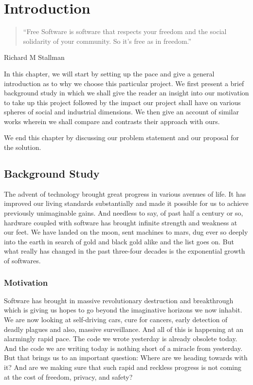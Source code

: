 \chapter{Introduction}

\begin{quotation}
    “Free Software is software that respects your freedom and the social solidarity of your community. So it’s free as in freedom.”
\end{quotation}

\begin{flushright}
    Richard M Stallman
\end{flushright}


In this chapter, we will start by setting up the pace and give a general introduction as to why we choose this particular project. We first present a brief background study in which we shall give the reader an insight into our motivation to take up this project followed by the impact our project shall have on various spheres of social and industrial dimensions. We then give an account of similar works wherein we shall compare and contrasts their approach with ours.

We end this chapter by discussing our problem statement and our proposal for the solution.

\section{Background Study}
The advent of technology brought great progress in various avenues of life. It has improved our living standards substantially and made it possible for us to achieve previously unimaginable gains. And needless to say, of past half a century or so, hardware coupled with software has brought infinite strength and weakness at our feet. We have landed on the moon, sent machines to mars, dug ever so deeply into the earth in search of gold and black gold alike and the list goes on. But what really has changed in the past three-four decades is the exponential growth of softwares.

\subsection{Motivation}
Software has brought in massive revolutionary destruction and breakthrough which is giving us hopes to go beyond the imaginative horizons we now inhabit. We are now looking at self-driving cars, cure for cancers, early detection of deadly plagues and also, massive surveillance. And all of this is happening at an alarmingly rapid pace. The code we wrote yesterday is already obsolete today. And the code we are writing today is nothing short of a miracle from yesterday. But that brings us to an important question: Where are we heading towards with it? And are we making sure that such rapid and reckless progress is not coming at the cost of freedom, privacy, and safety?

